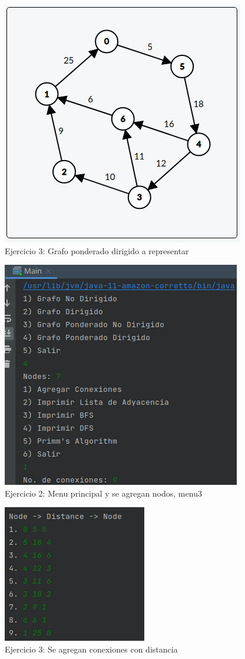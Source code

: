 \documentclass{article}
\begin{document}
			\begin{figure}[H]
				\centering
				\includegraphics[scale= 0.8]{images/e3graph2.png}
				\caption*{Ejercicio 3: Grafo ponderado dirigido a representar}
			\end{figure}
			
			\begin{figure}[H]
				\centering
				\includegraphics[scale= 0.9]{images/e37.png}
				\caption*{Ejercicio 2: Menu principal y se agregan nodos, menu3}
			\end{figure}
			
			\begin{figure}[H]
				\centering
				\includegraphics[scale= 0.9]{images/e38.png}
				\caption*{Ejercicio 3: Se agregan conexiones con distancia}
			\end{figure}
			
\end{document}
